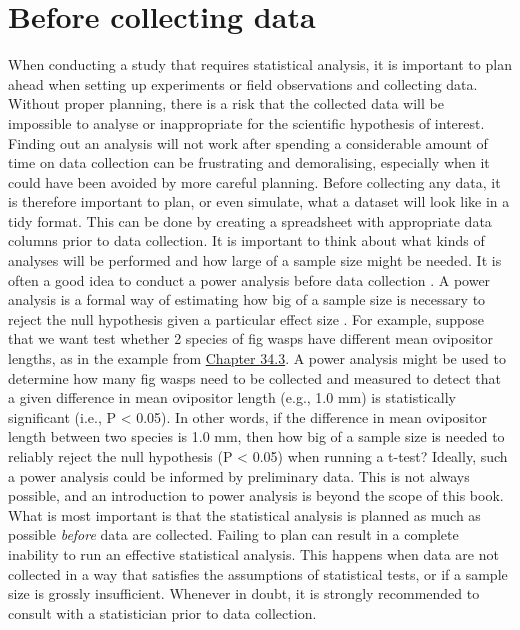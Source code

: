 \documentclass[
]{scrbook}
\begin{document}
\hypertarget{before-collecting-data}{%
\section{Before collecting data}\label{before-collecting-data}}

When conducting a study that requires statistical analysis, it is important to plan ahead when setting up experiments or field observations and collecting data.
Without proper planning, there is a risk that the collected data will be impossible to analyse or inappropriate for the scientific hypothesis of interest.
Finding out an analysis will not work after spending a considerable amount of time on data collection can be frustrating and demoralising, especially when it could have been avoided by more careful planning.
Before collecting any data, it is therefore important to plan, or even simulate, what a dataset will look like in a tidy format.
This can be done by creating a spreadsheet with appropriate data columns prior to data collection.
It is important to think about what kinds of analyses will be performed and how large of a sample size might be needed.
It is often a good idea to conduct a power analysis before data collection \citep{Steidl1997}.
A power analysis is a formal way of estimating how big of a sample size is necessary to reject the null hypothesis given a particular effect size \citep{Jones2003}.
For example, suppose that we want test whether 2 species of fig wasps have different mean ovipositor lengths, as in the example from \protect\hyperlink{randomisation-for-hypothesis-testing}{Chapter 34.3}.
A power analysis might be used to determine how many fig wasps need to be collected and measured to detect that a given difference in mean ovipositor length (e.g., 1.0 mm) is statistically significant (i.e., P \textless{} 0.05).
In other words, if the difference in mean ovipositor length between two species is 1.0 mm, then how big of a sample size is needed to reliably reject the null hypothesis (P \textless{} 0.05) when running a t-test?
Ideally, such a power analysis could be informed by preliminary data.
This is not always possible, and an introduction to power analysis is beyond the scope of this book.
What is most important is that the statistical analysis is planned as much as possible \emph{before} data are collected.
Failing to plan can result in a complete inability to run an effective statistical analysis.
This happens when data are not collected in a way that satisfies the assumptions of statistical tests, or if a sample size is grossly insufficient.
Whenever in doubt, it is strongly recommended to consult with a statistician prior to data collection.
\end{document}
